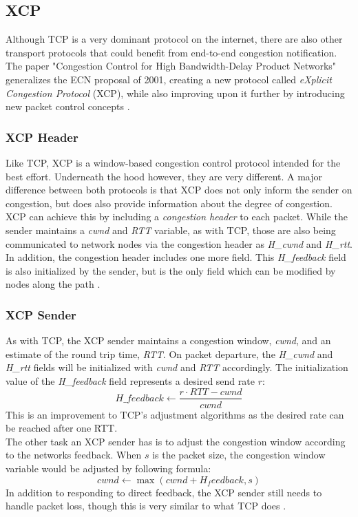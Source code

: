 \documentclass[a4paper,conference]{IEEEtran}
\begin{document}
\subsection{XCP}
Although TCP is a very dominant protocol on the internet, there are also other transport protocols that could benefit from end-to-end congestion notification. The paper "Congestion Control for High Bandwidth-Delay Product Networks"  generalizes the ECN proposal of 2001, creating a new protocol called \textit{eXplicit Congestion Protocol} (XCP), while also improving upon it further by introducing new packet control concepts \cite{katabi2002congestion,1498331}.

\subsubsection*{XCP Header}
Like TCP, XCP is a window-based congestion control protocol intended for the best effort. Underneath the hood however, they are very different. A major difference between both protocols is that XCP does not only inform the sender on congestion, but does also provide information about the degree of congestion. XCP can achieve this by including a \textit{congestion header} to each packet. While the sender maintains a \textit{cwnd} and \textit{RTT} variable, as with TCP, those are also being communicated to network nodes via the congestion header as \textit{H\_cwnd} and \textit{H\_rtt}. In addition, the congestion header includes one more field. This \textit{H\_feedback} field is also initialized by the sender, but is the only field which can be modified by nodes along the path \cite{katabi2002congestion,1498331}.

\subsubsection*{XCP Sender}
As with TCP, the XCP sender maintains a congestion window, \textit{cwnd}, and an estimate of the round trip time, \textit{RTT}. On packet departure, the \textit{H\_cwnd} and \textit{H\_rtt} fields will be initialized with \textit{cwnd} and \textit{RTT} accordingly. The initialization value of the \textit{H\_feedback} field represents a desired send rate $r$:
\[H\_feedback \leftarrow \frac{r \cdot RTT - cwnd}{cwnd}\]
This is an improvement to TCP's adjustment algorithms as the desired rate can be reached after one RTT.\\
The other task an XCP sender has is to adjust the congestion window according to the networks feedback. When $s$ is the packet size, the congestion window variable would be adjusted by following formula:
\[cwnd \leftarrow \max(cwnd + H_feedback, s)\]
In addition to responding to direct feedback, the XCP sender still needs to handle packet loss, though this is very similar to what TCP does \cite{katabi2002congestion}.
\end{document}
